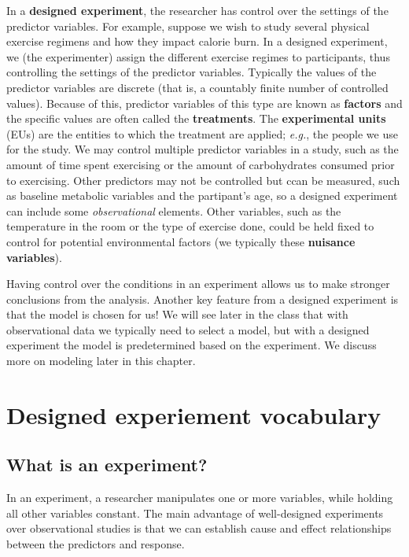 \documentclass[
]{book}
\begin{document}
In a \textbf{designed experiment}, the researcher has control over the settings of the predictor variables.
For example, suppose we wish to study several physical exercise regimens and how they impact calorie burn.
In a designed experiment, we (the experimenter) assign the different exercise regimes to participants, thus controlling the settings of the predictor variables.
Typically the values of the predictor variables are discrete (that is, a countably finite number of controlled values).
Because of this, predictor variables of this type are known as \textbf{factors} and the specific values are often called the \textbf{treatments}.
The \textbf{experimental units} (EUs) are the entities to which the treatment are applied; \emph{e.g.}, the people we use for the study.
We may control multiple predictor variables in a study, such as the amount of time spent exercising or the amount of carbohydrates consumed prior to exercising.
Other predictors may not be controlled but ccan be measured, such as baseline metabolic variables and the partipant's age, so a designed experiment can include some \emph{observational} elements.
Other variables, such as the temperature in the room or the type of exercise done, could be held fixed to control for potential environmental factors (we typically these \textbf{nuisance variables}).

Having control over the conditions in an experiment allows us to make stronger conclusions from the analysis.
Another key feature from a designed experiment is that the model is chosen for us!
We will see later in the class that with observational data we typically need to select a model, but with a designed experiment the model is predetermined based on the experiment.
We discuss more on modeling later in this chapter.

\hypertarget{designed-experiement-vocabulary}{%
\section{Designed experiement vocabulary}\label{designed-experiement-vocabulary}}

\hypertarget{what-is-an-experiment}{%
\subsection{What is an experiment?}\label{what-is-an-experiment}}

In an experiment, a researcher manipulates one or more variables, while holding all other variables constant.
The main advantage of well-designed experiments over observational studies is that we can establish cause and effect relationships between the predictors and response.
\end{document}

